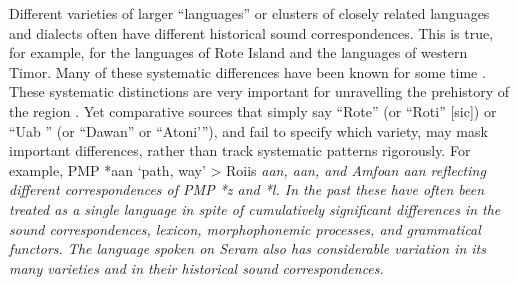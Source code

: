 Different varieties of larger “languages” or clusters of closely
related languages and dialects often have different historical sound correspondences.
This is true, for example,
for the languages of Rote Island
and the  languages of western Timor.
Many of these systematic differences have been known for
some time \citep{Jonker1908,Jonker1915}.
These systematic distinctions are very important for unravelling
the prehistory of the region \citep{Edwards2018a,Edwards2018b,Edwards2021}.
Yet comparative sources that simply say “Rote” (or “Roti” [sic])
or “Uab ” (or “Dawan” or “Atoni’”),
and fail to specify which variety,
may mask important differences,
rather than track systematic patterns rigorously.
For example, PMP *aan ‘path, way’ >
Roi{\Q}is  \it{aan},
 \it{aan},
and Amfo{\Q}an \it{aan} reflecting different correspondences
of PMP *z and *l.
In the past these have often been treated as a single language
in spite of cumulatively significant differences in the sound
correspondences, lexicon, morphophonemic processes, and grammatical functors.
The  language  spoken on Seram also has
considerable variation in its many varieties
and in their historical sound correspondences.